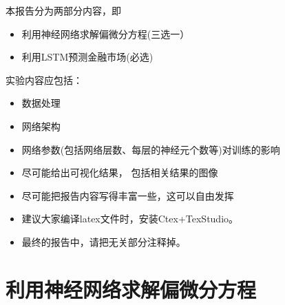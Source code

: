 \documentclass[addpoints,answers]{exam}
\begin{document}
\begin{center}
\end{center}

\vspace{5mm}

\begin{center}
  \hspace{5mm}
  \hspace{5mm}
\end{center}

\renewcommand{\solutiontitle}{\noindent\textbf{解:}\enspace}


\begin{remark}
	本报告分为两部分内容，即
	\begin{itemize}
		\item 利用神经网络求解偏微分方程(三选一）
		\item 利用LSTM预测金融市场(必选)
	\end{itemize}

实验内容应包括：
\begin{itemize}
	\item 数据处理 
	\item 网络架构
	\item 网络参数(包括网络层数、每层的神经元个数等)对训练的影响
	\item 尽可能给出可视化结果， 包括相关结果的图像
	\item 尽可能把报告内容写得丰富一些，这可以自由发挥
	\item 建议大家编译latex文件时，安装Ctex+TexStudio。
	\item 最终的报告中，请把无关部分注释掉。
\end{itemize}
\end{remark}

\section{利用神经网络求解偏微分方程}
\end{document}
